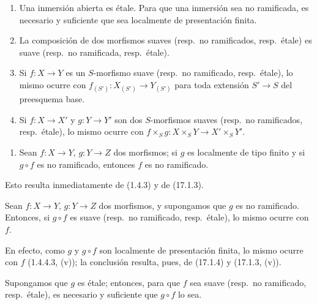 \begin{proposition}[17.3.3]
\label{IV.17.3.3}
\begin{enumerate}
  \item[\textup{(i)}] Una inmersión abierta es étale. Para que una inmersión sea no ramificada, es necesario y suficiente que sea localmente de presentación finita.
  \item[\textup{(ii)}] La composición de dos morfismos suaves \textup{(resp.}\ no ramificados, \textup{resp.}\ étale\textup{)} es suave \textup{(resp.}\ no ramificada, \textup{resp.}\ étale\textup{)}.
  \item[\textup{(iii)}] Si $f:X\to Y$ es un $S$-morfismo suave \textup{(resp.}\ no ramificado, \textup{resp.}\ étale\textup{)}, lo mismo ocurre con $f_{(S')}:X_{(S')}\to Y_{(S')}$ para toda extensión $S'\to S$ del preesquema base.
  \item[\textup{(iv)}] Si $f:X\to X'$ y $g:Y\to Y'$ son dos $S$-morfismos suaves \textup{(resp.}\ no ramificados, \textup{resp.}\ étale\textup{)}, lo mismo ocurre con $f\times_S g:X\times_S Y\to X'\times_S Y'$.
\end{enumerate}


\begin{enumerate}
  \item[\textup{(v)}] Sean $f:X\to Y$, $g:Y\to Z$ dos morfismos; si $g$ es localmente de tipo finito y si $g\circ f$ es no ramificado, entonces $f$ es no ramificado.
\end{enumerate}
\end{proposition}

Esto resulta inmediatamente de (1.4.3) y de (17.1.3).

\begin{proposition}[17.3.4]
\label{IV.17.3.4}
Sean $f:X\to Y$, $g:Y\to Z$ dos morfismos, y supongamos que $g$ es no ramificado. Entonces, si $g\circ f$ es suave \textup{(resp.}\ no ramificado, \textup{resp.}\ étale\textup{)}, lo mismo ocurre con $f$.
\end{proposition}

En efecto, como $g$ y $g\circ f$ son localmente de presentación finita, lo mismo ocurre con $f$ (1.4.4.3, (v)); la conclusión resulta, pues, de (17.1.4) y (17.1.3, (v)).

\begin{corollary}[17.3.5]
\label{IV.17.3.5}
Supongamos que $g$ es étale; entonces, para que $f$ sea suave \textup{(resp.}\ no ramificado, \textup{resp.}\ étale\textup{)}, es necesario y suficiente que $g\circ f$ lo sea.
\end{corollary}

